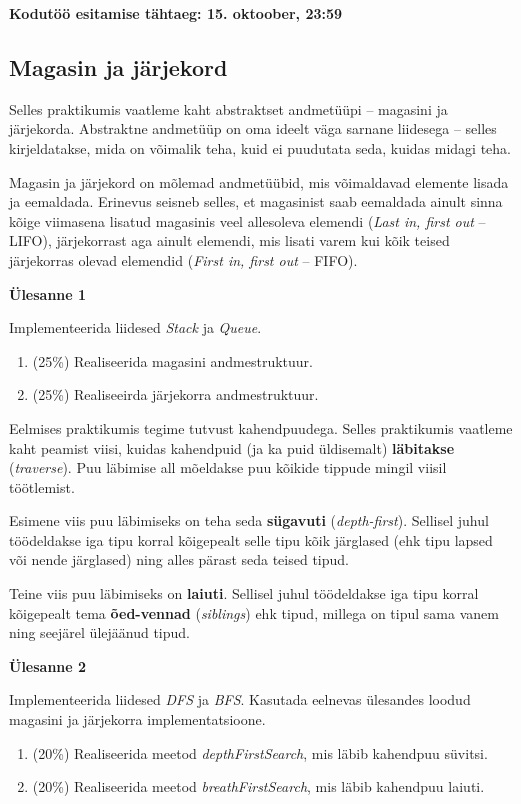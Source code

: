 \documentclass[a4paper]{article}
\begin{document}
\textbf{Kodutöö esitamise tähtaeg: 15. oktoober, 23:59}

{\center
\subsection*{Magasin ja järjekord}
}

Selles praktikumis vaatleme kaht abstraktset andmetüüpi -- magasini ja järjekorda. Abstraktne andmetüüp on oma ideelt väga sarnane liidesega -- selles kirjeldatakse, mida on võimalik teha, kuid ei puudutata seda, kuidas midagi teha.

Magasin ja järjekord on mõlemad andmetüübid, mis võimaldavad elemente lisada ja eemaldada. Erinevus seisneb selles, et magasinist saab eemaldada ainult sinna kõige viimasena lisatud magasinis veel allesoleva elemendi (\textit{Last in, first out} -- LIFO), järjekorrast aga ainult elemendi, mis lisati varem kui kõik teised järjekorras olevad elemendid (\textit{First in, first out} -- FIFO).



\begin{problem}
\textbf{Ülesanne 1}

Implementeerida liidesed \textit{Stack} ja \textit{Queue}.
\begin{enumerate}
\item  (25\%)
Realiseerida magasini andmestruktuur.
\item  (25\%)
Realiseeirda järjekorra andmestruktuur.
\end{enumerate}
\end{problem}


Eelmises praktikumis tegime tutvust kahendpuudega. Selles praktikumis vaatleme kaht peamist viisi, kuidas kahendpuid (ja ka puid üldisemalt) \textbf{läbitakse} (\textit{traverse}). Puu läbimise all mõeldakse puu kõikide tippude mingil viisil töötlemist.

Esimene viis puu läbimiseks on teha seda \textbf{sügavuti} (\textit{depth-first}). Sellisel juhul töödeldakse iga tipu korral kõigepealt selle tipu kõik järglased (ehk tipu lapsed või nende järglased) ning alles pärast seda teised tipud.

Teine viis puu läbimiseks on \textbf{laiuti}. Sellisel juhul töödeldakse iga tipu korral kõigepealt tema \textbf{õed-vennad} (\textit{siblings}) ehk tipud, millega on tipul sama vanem ning seejärel ülejäänud tipud.

\begin{problem}
\textbf{Ülesanne 2}

Implementeerida liidesed \textit{DFS} ja \textit{BFS}. Kasutada eelnevas ülesandes loodud magasini ja järjekorra implementatsioone.
\begin{enumerate}
\item  (20\%)
Realiseerida meetod \textit{depthFirstSearch}, mis läbib kahendpuu süvitsi.
\item  (20\%)
Realiseerida meetod \textit{breathFirstSearch}, mis läbib kahendpuu laiuti.
\end{enumerate}
\end{problem}
\end{document}
